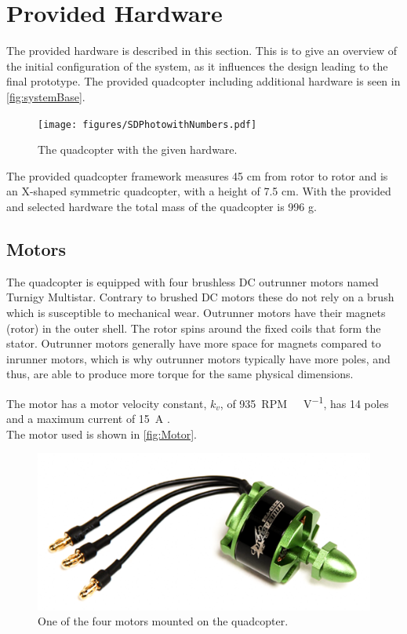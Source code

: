 \section{Provided Hardware}\label{sec:hardware}
The provided hardware is described in this section. This is to give an overview of the initial configuration of the system, as it influences the design leading to the final prototype. The provided quadcopter including additional hardware is seen in \autoref{fig:systemBase}.
%
\begin{figure}[H]
  \centering
  \texttt{[image: figures/SDPhotowithNumbers.pdf]}
  \caption{The quadcopter with the given hardware.}
  \label{fig:systemBase}
\end{figure}
%
The provided quadcopter framework measures 45 cm from rotor to rotor and is an X-shaped symmetric quadcopter, with a height of 7.5 cm. With the provided and selected hardware the total mass of the quadcopter is 996 g.
\subsection{Motors}
The quadcopter is equipped with four brushless DC outrunner motors named Turnigy Multistar. Contrary to brushed DC motors these do not rely on a brush which is susceptible to mechanical wear. Outrunner motors have their magnets (rotor) in the outer shell. The rotor spins around the fixed coils that form the stator. Outrunner motors generally have more space for magnets compared to inrunner motors, which is why outrunner motors typically have more poles, and thus, are able to produce more torque for the same physical dimensions. 

The motor has a motor velocity constant, $k_v$, of \SI{935}{RPM\ V^{-1}}, has 14 poles and a maximum current of \SI{15}{A} \cite{HkingPropeller}. \\
The motor used is shown in \autoref{fig:Motor}.
\vspace{-0.5 cm}
\begin{figure}[H]
	\centering
	\includegraphics[scale=0.4]{figures/motorphoto.png}
	\caption{One of the four motors mounted on the quadcopter.\cite{HkingPropeller}}
	\label{fig:Motor}
\end{figure} 
